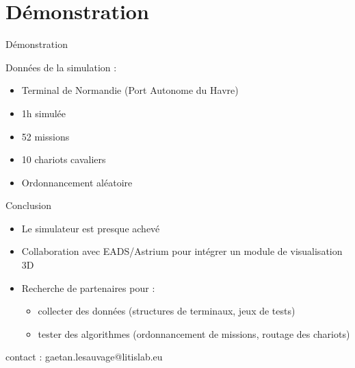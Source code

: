 \documentclass{beamer}
\begin{document}
\section{Démonstration}
  \begin{frame}{Démonstration}
    \begin{block}{Données de la simulation : }
     \begin{itemize}
      \item Terminal de Normandie (Port Autonome du Havre)
      \item 1h simulée
      \item 52 missions
      \item 10 chariots cavaliers
      \item Ordonnancement aléatoire
     \end{itemize}
    \end{block}
  \end{frame}

  \begin{frame}{Conclusion}
    \begin{itemize}
     \item Le simulateur est presque achevé
    \pause
     \item Collaboration avec EADS/Astrium pour intégrer un module de visualisation 3D
    \pause
     \item Recherche de partenaires pour : 
	\begin{itemize}
	 \item collecter des données (structures de terminaux, jeux de tests)
	 \item tester des algorithmes (ordonnancement de missions, routage des chariots)
	\end{itemize}
    \end{itemize}
  \pause
  \begin{center}
  contact : gaetan.lesauvage@litislab.eu
  \end{center}
  \end{frame}
\end{document}
